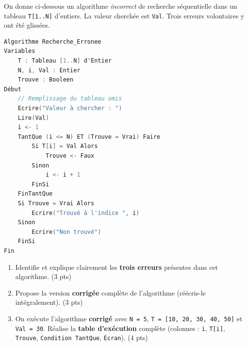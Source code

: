 \documentclass[11pt]{article}
\begin{document}
\begin{exercice}
On donne ci-dessous un algorithme \emph{incorrect} de recherche séquentielle dans un tableau \texttt{T[1..N]} d'entiers. La valeur cherchée est \texttt{Val}. Trois erreurs volontaires y ont été glissées.

\begin{lstlisting}[language=C]
Algorithme Recherche_Erronee
Variables
    T : Tableau [1..N] d'Entier
    N, i, Val : Entier
    Trouve : Booleen
Début
    // Remplissage du tableau omis
    Ecrire("Valeur à chercher : ")
    Lire(Val)
    i <- 1
    TantQue (i <= N) ET (Trouve = Vrai) Faire
        Si T[i] = Val Alors
            Trouve <- Faux
        Sinon
            i <- i + 1
        FinSi
    FinTantQue
    Si Trouve = Vrai Alors
        Ecrire("Trouvé à l'indice ", i)
    Sinon
        Ecrire("Non trouvé")
    FinSi
Fin
\end{lstlisting}

\begin{enumerate}
    \item Identifie et explique clairement les \textbf{trois erreurs} présentes dans cet algorithme. \hfill (3 pts)
    \item Propose la version \textbf{corrigée} complète de l'algorithme (réécris-le intégralement). \hfill (3 pts)
    \item On exécute l'algorithme \textbf{corrigé} avec \texttt{N = 5}, \texttt{T = [10, 20, 30, 40, 50]} et \texttt{Val = 30}.
    Réalise la \textbf{table d'exécution} complète (colonnes : \texttt{i}, \texttt{T[i]}, \texttt{Trouve}, \texttt{Condition TantQue}, \texttt{Écran}). \hfill (4 pts)
\end{enumerate}
\end{exercice}
\end{document}
